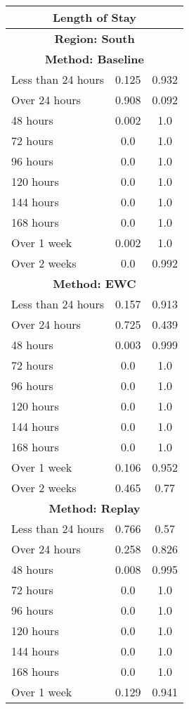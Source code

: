\documentclass{article}
\begin{document}
\begin{longtable}{lcc}
\toprule
\multicolumn{3}{c}{\textbf{Length of Stay}} \\
\toprule
\endfirsthead

\midrule
\endhead

\multicolumn{3}{c}{\textbf{Region: South}} \\
\multicolumn{3}{c}{\textbf{Method: Baseline}} \\
\midrule
Less than 24 hours & 0.125 & 0.932 \\
Over 24 hours & 0.908 & 0.092 \\
48 hours & 0.002 & 1.0 \\
72 hours & 0.0 & 1.0 \\
96 hours & 0.0 & 1.0 \\
120 hours & 0.0 & 1.0 \\
144 hours & 0.0 & 1.0 \\
168 hours & 0.0 & 1.0 \\
Over 1 week & 0.002 & 1.0 \\
Over 2 weeks & 0.0 & 0.992 \\
\midrule
\multicolumn{3}{c}{\textbf{Method: EWC}} \\
\midrule
Less than 24 hours & 0.157 & 0.913 \\
Over 24 hours & 0.725 & 0.439 \\
48 hours & 0.003 & 0.999 \\
72 hours & 0.0 & 1.0 \\
96 hours & 0.0 & 1.0 \\
120 hours & 0.0 & 1.0 \\
144 hours & 0.0 & 1.0 \\
168 hours & 0.0 & 1.0 \\
Over 1 week & 0.106 & 0.952 \\
Over 2 weeks & 0.465 & 0.77 \\
\midrule
\multicolumn{3}{c}{\textbf{Method: Replay}} \\
\midrule
Less than 24 hours & 0.766 & 0.57 \\
Over 24 hours & 0.258 & 0.826 \\
48 hours & 0.008 & 0.995 \\
72 hours & 0.0 & 1.0 \\
96 hours & 0.0 & 1.0 \\
120 hours & 0.0 & 1.0 \\
144 hours & 0.0 & 1.0 \\
168 hours & 0.0 & 1.0 \\
Over 1 week & 0.129 & 0.941 \\

\end{longtable}
\end{document}
